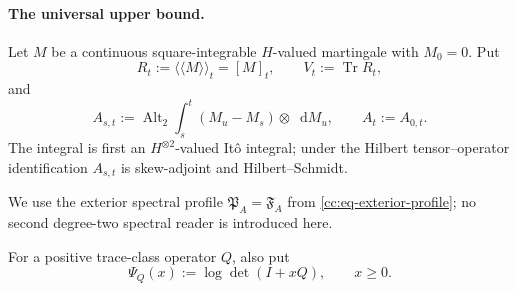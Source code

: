 \documentclass[10pt,reqno]{amsart}
\theoremstyle{plain}
\theoremstyle{definition}
\theoremstyle{remark}
\begin{document}
\paragraph{The universal upper bound.}
Let \(M\) be a continuous square-integrable \(H\)-valued martingale with
\(M_0=0\).  Put
\[
 R_t:=\langle\!\langle M\rangle\!\rangle_t=[M]_t,
 \qquad V_t:=\operatorname{Tr}R_t,
\]
and
\begin{equation}
 A_{s,t}:=\operatorname{Alt}_2
 \int_s^t(M_u-M_s)\otimes\mathop{}\!\mathrm dM_u,
 \qquad A_t:=A_{0,t}.
 \label{cc:eq-critical-martingale-area}
\end{equation}
The integral is first an \(H^{\otimes2}\)-valued It\^o integral; under the
Hilbert tensor--operator identification \(A_{s,t}\) is skew-adjoint and
Hilbert--Schmidt.

We use the exterior spectral profile \(\mathfrak P_A=\mathfrak F_A\)
from \eqref{cc:eq-exterior-profile}; no second degree-two spectral reader is
introduced here.

For a positive trace-class operator \(Q\), also put
\begin{equation}
 \Psi_Q(x):=\log\det(I+xQ),\qquad x\geq0.
 \label{cc:eq-positive-determinant-profile}
\end{equation}
\end{document}
